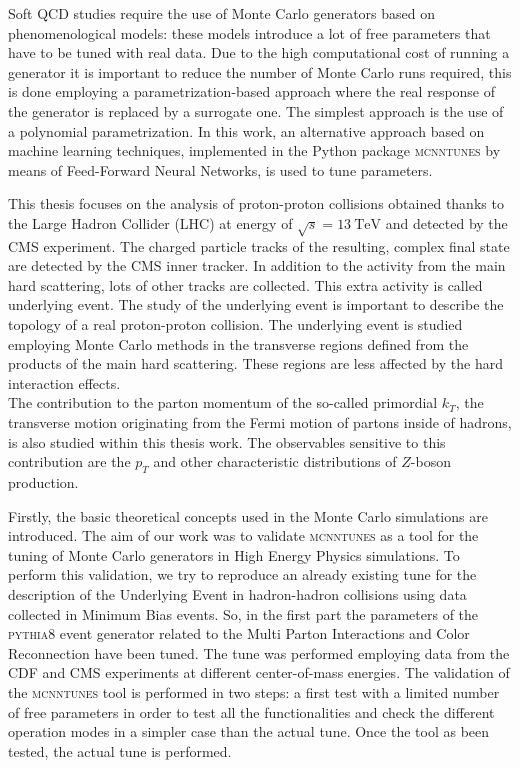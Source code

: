 Soft QCD studies require the use of Monte Carlo generators based on phenomenological models: these models introduce a lot of free parameters that have to be tuned with real data.
Due to the high computational cost of running a generator it is important to reduce the number of Monte Carlo runs required, this is done employing a parametrization-based approach where the real response of the generator is replaced by a surrogate one. The simplest approach is the use of a polynomial parametrization. 
In this work, an alternative approach based on machine learning techniques, implemented in the Python package \textsc{mcnntunes} by means of Feed-Forward Neural Networks, is used to tune parameters. 

\medskip
This thesis focuses on the analysis of proton-proton collisions obtained thanks to the Large Hadron Collider (LHC) at energy of $\sqrt{s}=13\ \mathrm{TeV}$ and detected by the CMS experiment. The charged particle tracks of the resulting, complex final state are detected by the CMS inner tracker. In addition to the activity from the main hard scattering, lots of other tracks are collected. This extra activity is called underlying event. The study of the  underlying event is important to describe the topology of a real proton-proton collision. The underlying event is studied employing Monte Carlo methods in the transverse regions defined from the products of the main hard scattering. These regions are less affected by the hard interaction effects.
\\
The contribution to the parton momentum of the so-called primordial $k_T$, the transverse motion originating from the Fermi motion of partons inside of hadrons, is also studied within this thesis work. The observables sensitive to this contribution are the $p_T$ and other characteristic distributions of $Z$-boson production.
\medskip

Firstly, the basic theoretical concepts used in the Monte Carlo simulations are introduced.
The aim of our work was to validate \textsc{mcnntunes} as a tool for the tuning of Monte Carlo generators in High Energy Physics simulations.
To perform this validation, we try to reproduce an already existing tune for the description of the Underlying Event in hadron-hadron collisions using data collected in Minimum Bias events.
So, in the first part the parameters of the \textsc{pythia}8 event generator related to the Multi Parton Interactions and Color Reconnection  have been tuned. The tune was performed employing data from the CDF and CMS experiments at different center-of-mass energies. The validation of the \textsc{mcnntunes} tool is performed in two steps: a first test with a limited number of free parameters in order to test all the functionalities and check the different operation modes in a simpler case than the actual tune. Once the tool as been tested, the actual tune is performed. 

